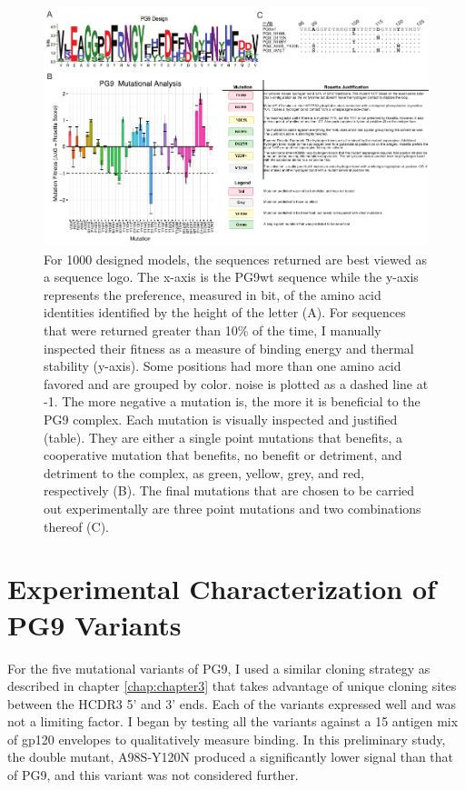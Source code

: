 \begin{figure}[!t]
   \centering
   \includegraphics[scale=1.5,width=.99\textwidth]{images/chapter4/figure4_3.pdf} %
   \caption[Redesign of PG9 HCDR3]{For 1000 designed models, the sequences returned are best viewed as a sequence logo. The x-axis is the PG9wt sequence while the y-axis represents the preference, measured in bit, of the amino acid identities identified by the height of the letter (A). For sequences that were returned greater than 10\% of the time, I manually inspected their fitness as a measure of binding energy and thermal stability (y-axis). Some positions had more than one amino acid favored and are grouped by color. \rosetta noise is plotted as a dashed line at -1. The more negative a mutation is, the more it is beneficial to the PG9 complex. Each mutation is visually inspected and justified (table). They are either a single point mutations that benefits, a cooperative mutation that benefits, no benefit or detriment, and detriment to the complex, as green, yellow, grey, and red, respectively (B). The final mutations that are chosen to be carried out experimentally are three point mutations and two combinations thereof (C).}
   \label{fig:figure4_3}
\end{figure}


\section{Experimental Characterization of PG9 Variants}
For the five mutational variants of PG9, I used a similar cloning strategy as described in chapter \ref{chap:chapter3} that takes advantage of unique cloning sites between the HCDR3 5' and 3' ends. Each of the variants expressed well and was not a limiting factor. I began by testing all the variants against a 15 antigen mix of gp120 envelopes to qualitatively measure binding. In this preliminary study, the double mutant, A98S-Y120N produced a significantly lower signal than that of PG9, and this variant was not considered further.

